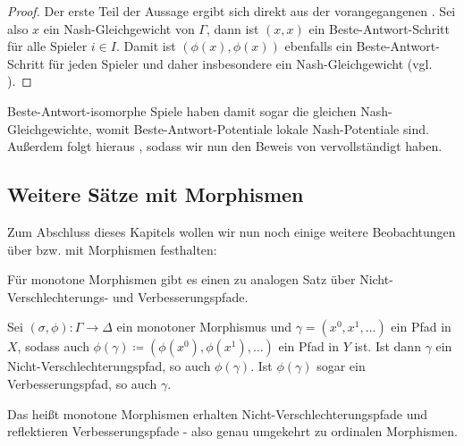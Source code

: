 \begin{proof}
	Der erste Teil der Aussage ergibt sich direkt aus der vorangegangenen . Sei also $x$ ein Nash-Gleichgewicht von $\Gamma$, dann ist $(x,x)$ ein Beste-Antwort-Schritt für alle Spieler $i \in I$. Damit ist $(\phi(x), \phi(x))$ ebenfalls ein Beste-Antwort-Schritt für jeden Spieler und daher insbesondere ein Nash-Gleichgewicht (vgl. ).
\end{proof}

Beste-Antwort-isomorphe Spiele haben damit sogar die gleichen Nash-Gleichgewichte, womit Beste-Antwort-Potentiale lokale Nash-Potentiale sind. Außerdem folgt hieraus , sodass wir nun den Beweis von  vervollständigt haben.


\subsection{Weitere Sätze mit Morphismen}

Zum Abschluss dieses Kapitels wollen wir nun noch einige weitere Beobachtungen über bzw. mit Morphismen festhalten:

Für monotone Morphismen gibt es einen zu  analogen Satz über Nicht-Verschlechterungs- und Verbesserungspfade.

\begin{prop}
	Sei $(\sigma, \phi): \Gamma \to \Delta$ ein monotoner Morphismus und $\gamma = (x^0, x^1, \dots)$ ein Pfad in $X$, sodass auch $\phi(\gamma) \coloneqq (\phi(x^0), \phi(x^1), \dots)$ ein Pfad in $Y$ ist. Ist dann $\gamma$ ein Nicht-Verschlechterungspfad, so auch $\phi(\gamma)$. Ist $\phi(\gamma)$ sogar ein Verbesserungspfad, so auch $\gamma$.
\end{prop}

Das heißt monotone Morphismen erhalten Nicht-Verschlechterungspfade und reflektieren Verbesserungspfade - also genau umgekehrt zu ordinalen Morphismen.

